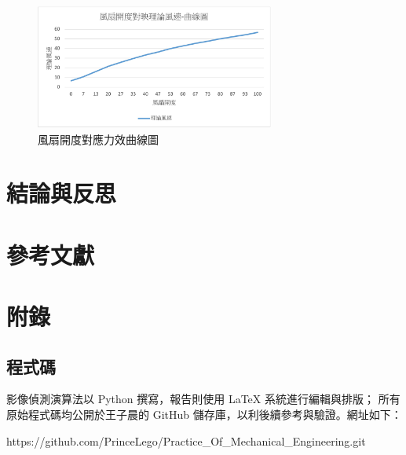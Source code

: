 \documentclass[12pt]{article}       %
\begin{document}
\begin{figure}[H]
    \centering
    \includegraphics[width=0.7\textwidth]{28.jpg}     %
    \caption{風扇開度對應力效曲線圖}    %
    \label{fig:32}    %
\end{figure}

\section{\centering 結論與反思}
\hspace{2em}






\section{\centering 參考文獻}
\renewcommand{\refname}{}  %
\printbibliography  %

\section{\centering 附錄}

\subsection{程式碼} 
\hspace{2em}影像偵測演算法以 Python 撰寫，報告則使用 LaTeX 系統進行編輯與排版；
所有原始程式碼均公開於王子晨的 GitHub 儲存庫，以利後續參考與驗證。網址如下：

https://github.com/PrinceLego/Practice\_Of\_Mechanical\_Engineering.git
\end{document}
